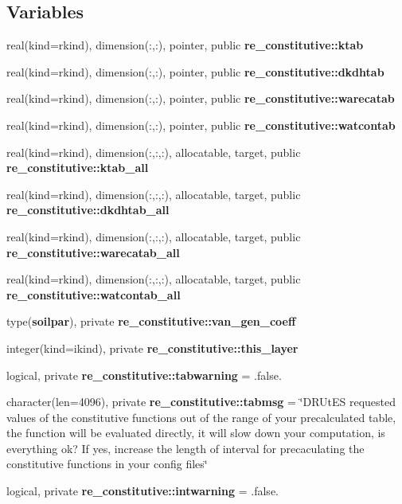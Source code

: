 \subsection*{Variables}
\begin{DoxyCompactItemize}
\item 
real(kind=rkind), dimension(\+:,\+:), pointer, public {\bf re\+\_\+constitutive\+::ktab}
\item 
real(kind=rkind), dimension(\+:,\+:), pointer, public {\bf re\+\_\+constitutive\+::dkdhtab}
\item 
real(kind=rkind), dimension(\+:,\+:), pointer, public {\bf re\+\_\+constitutive\+::warecatab}
\item 
real(kind=rkind), dimension(\+:,\+:), pointer, public {\bf re\+\_\+constitutive\+::watcontab}
\item 
real(kind=rkind), dimension(\+:,\+:,\+:), allocatable, target, public {\bf re\+\_\+constitutive\+::ktab\+\_\+all}
\item 
real(kind=rkind), dimension(\+:,\+:,\+:), allocatable, target, public {\bf re\+\_\+constitutive\+::dkdhtab\+\_\+all}
\item 
real(kind=rkind), dimension(\+:,\+:,\+:), allocatable, target, public {\bf re\+\_\+constitutive\+::warecatab\+\_\+all}
\item 
real(kind=rkind), dimension(\+:,\+:,\+:), allocatable, target, public {\bf re\+\_\+constitutive\+::watcontab\+\_\+all}
\item 
type({\bf soilpar}), private {\bf re\+\_\+constitutive\+::van\+\_\+gen\+\_\+coeff}
\item 
integer(kind=ikind), private {\bf re\+\_\+constitutive\+::this\+\_\+layer}
\item 
logical, private {\bf re\+\_\+constitutive\+::tabwarning} = .false.
\item 
character(len=4096), private {\bf re\+\_\+constitutive\+::tabmsg} = \char`\"{}D\+R\+Ut\+ES requested values of the constitutive functions out of the range of your precalculated table, the function will be evaluated directly, it will slow down your computation, is everything ok? If yes, increase the length of interval for precaculating the constitutive functions in your config files\char`\"{}
\item 
logical, private {\bf re\+\_\+constitutive\+::intwarning} = .false.
\end{DoxyCompactItemize}
